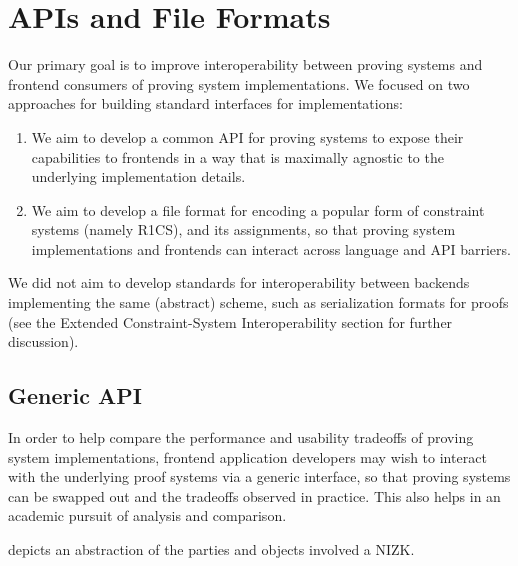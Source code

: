\section{APIs and File Formats}
\label{implem:apis-and-file-formats}

Our primary goal is to improve interoperability between proving systems and frontend consumers of proving system implementations. We focused on two approaches for building standard interfaces for implementations:

\begin{enumerate}
\item We aim to develop a common API for proving systems to expose their capabilities to frontends in a way that is maximally agnostic to the underlying implementation details.
\item We aim to develop a file format for encoding a popular form of constraint systems (namely R1CS), and its assignments, so that proving system implementations and frontends can interact across language and API barriers.
\end{enumerate}

We did not aim to develop standards for interoperability between backends implementing the same (abstract) scheme, such as serialization formats for proofs (see the Extended Constraint-System Interoperability section for further discussion).


\subsection{Generic API}
\label{implem:apis-and-file-formats:generic-api}

In order to help compare the performance and usability tradeoffs of proving system implementations, frontend application developers may wish to interact with the underlying proof systems via a generic interface, so that proving systems can be swapped out and the tradeoffs observed in practice. 
This also helps in an academic pursuit of analysis and comparison.

 depicts an abstraction of the parties and objects involved a NIZK.

